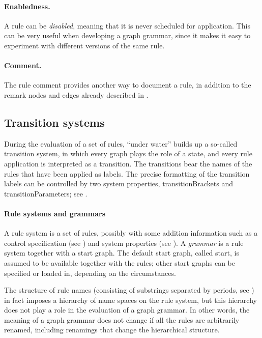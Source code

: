 \paragraph{Enabledness.}

A rule can be \emph{disabled}, meaning that it is never scheduled for
application. This can be very useful when developing a graph grammar, since it
makes it easy to experiment with different versions of the same rule.

\paragraph{Comment.}

The rule comment provides another way to document a rule, in addition to the
remark nodes and edges already described in .

\subsection{Transition systems}

During the evaluation of a set of rules, \Groove{} ``under water'' builds up a
so-called transition system, in which every graph plays the role of a state,
and every rule application is interpreted as a transition. The transitions bear
the names of the rules that have been applied as labels. The precise formatting
of the transition labels can be controlled by two system properties,
\textsf{transitionBrackets} and \textsf{transitionParameters}; see
.

\paragraph{Rule systems and grammars}

A rule system is a set of rules, possibly with some addition information such
as a control specification (see ) and system properties (see
). A \emph{grammar} is a rule system together with a
start graph. The default start graph, called \textsf{start}, is assumed to be
available together with the rules; other start graphs can be specified or
loaded in, depending on the circumstances.

The structure of rule names (consisting of substrings separated by periods, see
) in fact imposes a hierarchy of name spaces on the rule system,
but this hierarchy does not play a role in the evaluation of a graph grammar.
In other words, the meaning of a graph grammar does not change if all the rules
are arbitrarily renamed, including renamings that change the hierarchical
structure.
